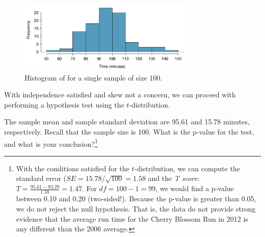 \begin{figure}
\centering
\includegraphics[width=0.77\textwidth]{ch_inference_for_means/figures/run10SampHistograms/run10SampHistograms} 
\caption{Histogram of  for a single sample of size 100.}
\label{run10SampHistogramsInHTForMeanSubsection}
\end{figure}

With independence satisfied and skew not a concern, we can proceed with performing a hypothesis test using the $t$-distribution.

\begin{exercise}
The sample mean and sample standard deviation are 95.61 and 15.78 minutes, respectively. Recall that the sample size is 100. What is the p-value for the test, and what is your conclusion?\footnote{With the conditions satisfied for the $t$-distribution, we can compute the standard error ($SE = 15.78 / \sqrt{100} = 1.58$ and the \emph{T score}: $T = \frac{95.61 - 93.29}{1.58} = 1.47$. For $df = 100 - 1 = 99$, we would find a p-value between 0.10 and 0.20 (two-sided!). Because the p-value is greater than 0.05, we do not reject the null hypothesis. That is, the data do not provide strong evidence that the average run time for the Cherry Blossom Run in 2012 is any different than the 2006 average.}
\end{exercise}

